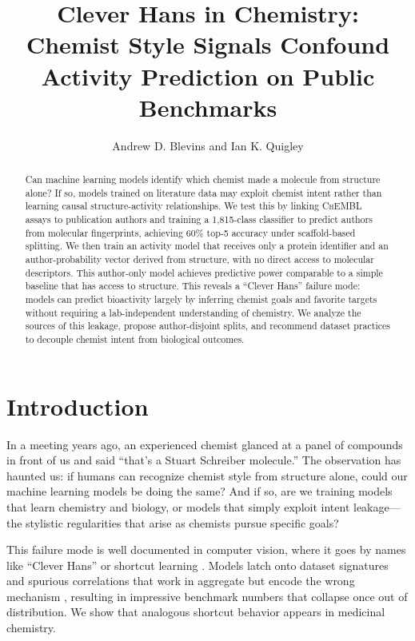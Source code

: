 \documentclass[11pt]{article}
\title{Clever Hans in Chemistry: Chemist Style Signals Confound Activity Prediction on Public Benchmarks}
\author{Andrew D. Blevins and Ian K. Quigley}
\date{}
\begin{document}
\maketitle

\begin{abstract}
Can machine learning models identify which chemist made a molecule from structure alone? If so, models trained on literature data may exploit chemist intent rather than learning causal structure-activity relationships. We test this by linking \textsc{ChEMBL} assays to publication authors and training a 1,815-class classifier to predict authors from molecular fingerprints, achieving 60\% top-5 accuracy under scaffold-based splitting. We then train an activity model that receives only a protein identifier and an author-probability vector derived from structure, with no direct access to molecular descriptors. This author-only model achieves predictive power comparable to a simple baseline that has access to structure. This reveals a ``Clever Hans'' failure mode: models can predict bioactivity largely by inferring chemist goals and favorite targets without requiring a lab-independent understanding of chemistry. We analyze the sources of this leakage, propose author-disjoint splits, and recommend dataset practices to decouple chemist intent from biological outcomes.
\end{abstract}


\section{Introduction}

In a meeting years ago, an experienced chemist glanced at a panel of compounds in front of us and said ``that's a Stuart Schreiber molecule.'' The observation has haunted us: if humans can recognize chemist style from structure alone, could our machine learning models be doing the same? And if so, are we training models that learn chemistry and biology, or models that simply exploit intent leakage---the stylistic regularities that arise as chemists pursue specific goals?

This failure mode is well documented in computer vision, where it goes by names like ``Clever Hans'' or shortcut learning \citep{lapuschkin2019cleverhans,geirhos2020shortcut}. Models latch onto dataset signatures and spurious correlations that work in aggregate but encode the wrong mechanism \citep{torralba2011unbiased}, resulting in impressive benchmark numbers that collapse once out of distribution. We show that analogous shortcut behavior appears in medicinal chemistry.
\end{document}
